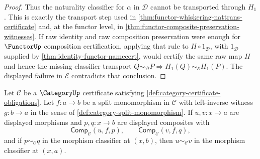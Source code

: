 \begin{proof}
Thus the naturality classifier for $\alpha$ in $\mathcal D$ cannot be transported through $H_1$. This is exactly the transport step used in \autoref{thm:functor-whiskering-nattrans-certificate} and, at the functor level, in \autoref{thm:functor-composite-preservation-witnesses}. If raw identity and raw composition preservation were enough for $\FunctorUp$ composition certification, applying that rule to $H\circ 1_{\mathcal D}$, with $1_{\mathcal D}$ supplied by \autoref{thm:identity-functor-namecert}, would certify the same raw map $H$ and hence the missing classifier transport $Q\sim_{\mathcal D}P\Rightarrow H_1(Q)\sim_{\mathcal E}H_1(P)$. The displayed failure in $\mathcal E$ contradicts that conclusion.
\end{proof}

\begin{theorem}
\label{thm:category-split-monomorphism-left-cancellative}
Let $\mathcal C$ be a $\CategoryUp$ certificate satisfying
\autoref{def:category-certificate-obligations}. Let $f:a\to b$ be a split
monomorphism in $\mathcal C$ with left-inverse witness $g:b\to a$ in the
sense of \autoref{def:category-split-monomorphism}. If $u,v:x\to a$ are
displayed morphisms and $p,q:x\to b$ are displayed composites with
$$
\mathsf{Comp}_{\mathcal C}(u,f,p),
\qquad
\mathsf{Comp}_{\mathcal C}(v,f,q),
$$
and if $p\sim_{\mathcal C}q$ in the morphism classifier at $(x,b)$, then
$u\sim_{\mathcal C}v$ in the morphism classifier at $(x,a)$.
\end{theorem}
